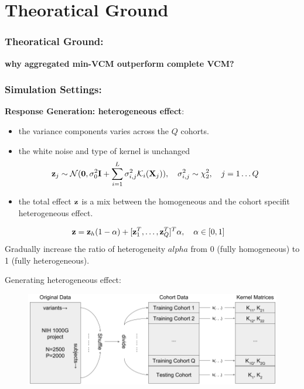 \documentclass{beamer}
\begin{document}
\section{Theoratical Ground}
\begin{frame} \frametitle{Theoratical Ground:}%
  \textbf{why aggregated min-VCM outperform complete VCM?}
\end{frame}
\begin{frame}
  \frametitle{Simulation Settings:} %
  \textbf{Response Generation: heterogeneous effect}:\\
  \begin{itemize}
  \item the variance components varies across the $Q$ cohorts.
  \item the white noise and type of kernel is unchanged
    \begin{align*}
      \mathbf{z}_j & \sim \mathcal{N}(\boldsymbol{0}, \sigma^2_0 \textbf{I} + \sum_{i=1}^L
              \sigma_{i,j}^2 \mathcal{K}_i(\mathbf{X}_j)), \quad
              \sigma_{i,j}^2 \sim \chi_2^2, \quad
              j = 1 \dots Q
    \end{align*}
  \item the total effect $\mathbf{z}$ is a mix between the homogeneous and
    the cohort specifit heterogeneous effect.
  \end{itemize}
  \begin{align*}
    \mathbf{z} & = \mathbf{z}_h (1-\alpha) + [\mathbf{z}_1^T, \dots, \mathbf{z}_Q^T]^T \alpha,
          \quad \alpha \in [0, 1]
  \end{align*}
  Gradually increase the ratio of heterogeneity $alpha$ from 0 (fully
  homogeneous) to 1 (fully heterogeneous).
\end{frame}
\begin{frame}
  Generating heterogeneous effect:
  \begin{figure}
    \centering
    \includegraphics[width=\linewidth]{kma_sim_1kg.png}
  \end{figure}
\end{frame}
\end{document}
